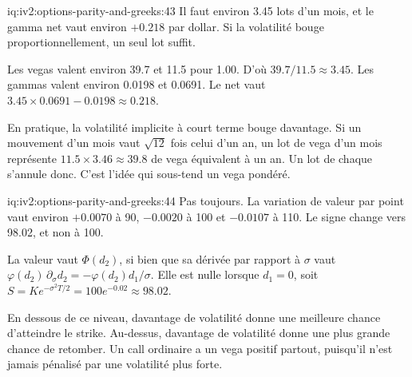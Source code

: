 \begin{solution}{iq:iv2:options-parity-and-greeks:43}
Il faut environ 3.45 lots d'un mois, et le gamma net vaut environ $+0.218$ par dollar. Si la volatilité bouge proportionnellement, un seul lot suffit.

Les vegas valent environ 39.7 et 11.5 pour 1.00. D'où $39.7/11.5 \approx 3.45$. Les gammas valent environ 0.0198 et 0.0691. Le net vaut $3.45 \times 0.0691 - 0.0198 \approx 0.218$.

En pratique, la volatilité implicite à court terme bouge davantage. Si un mouvement d'un mois vaut $\sqrt{12}$ fois celui d'un an, un lot de vega d'un mois représente $11.5 \times 3.46 \approx 39.8$ de vega équivalent à un an. Un lot de chaque s'annule donc. C'est l'idée qui sous-tend un vega pondéré.

\end{solution}

\begin{solution}{iq:iv2:options-parity-and-greeks:44}
Pas toujours. La variation de valeur par point vaut environ $+0.0070$ à 90, $-0.0020$ à 100 et $-0.0107$ à 110. Le signe change vers 98.02, et non à 100.

La valeur vaut $\Phi(d_2)$, si bien que sa dérivée par rapport à $\sigma$ vaut $\varphi(d_2)\,\partial_\sigma d_2 = -\varphi(d_2)d_1/\sigma$. Elle est nulle lorsque $d_1 = 0$, soit $S = Ke^{-\sigma^2T/2} = 100e^{-0.02} \approx 98.02$.

En dessous de ce niveau, davantage de volatilité donne une meilleure chance d'atteindre le strike. Au-dessus, davantage de volatilité donne une plus grande chance de retomber. Un call ordinaire a un vega positif partout, puisqu'il n'est jamais pénalisé par une volatilité plus forte.

\end{solution}

